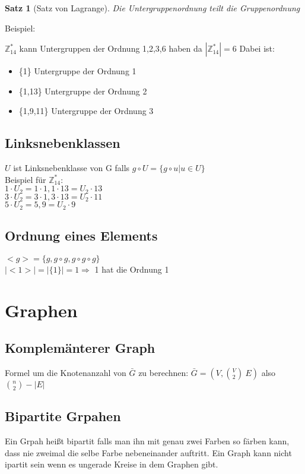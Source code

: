 \documentclass[12pt, letterpaper, twoside]{article}
\newtheorem{theorem}{Satz}[section]
\newcommand{\compl}[1]{\bar{#1}}
\begin{document}
\begin{theorem}[Satz von Lagrange] Die Untergruppenordnung teilt die Gruppenordnung\end{theorem}

Beispiel:

$\mathbb{Z}_{14}^* $ kann Untergruppen der Ordnung 1,2,3,6 haben da $ |\mathbb{Z}_{14}^*| = 6 $
Dabei ist:
\begin{itemize}
	\item \{1\} Untergruppe der Ordnung  1
	\item \{1,13\} Untergruppe der Ordnung 2
	\item \{1,9,11\} Untergruppe der Ordnung 3
\end{itemize}

\subsection{Linksnebenklassen}

$U$ ist Linksnebenklasse von G falls $g \circ U = \{g\circ u | u \in U\}$ \\
\indent
Beispiel für $\mathbb{Z}_{14}^* $:\\
\indent
$1 \cdot U_2 = {1\cdot1,1\cdot13} = U_2 \cdot 13$\\
\indent
$3 \cdot U_2 = {3\cdot1,3\cdot13} = U_2 \cdot 11$\\
\indent
$5 \cdot U_2 = {5,9} = U_2 \cdot 9$\\

\subsection{Ordnung eines Elements}
$<g> = \{g, g \circ g, g\circ g \circ g\}$\\
$|<1>| = | \{1\} |= 1  \Rightarrow $ 1 hat die Ordnung 1

\section{Graphen}

\subsection{Komplemänterer Graph}
Formel um die Knotenanzahl von $ \compl{G} $ zu berechnen: $ \compl{G} = (V, \binom{V}{2} \ E )$ also $\binom{n}{2} - |E|$


\subsection{Bipartite Grpahen}
Ein Grpah heißt bipartit falls man ihn mit genau zwei Farben so färben kann, dass nie zweimal die selbe Farbe nebeneinander auftritt.
Ein Graph kann nicht ipartit sein wenn es ungerade Kreise in dem Graphen gibt.
\end{document}
